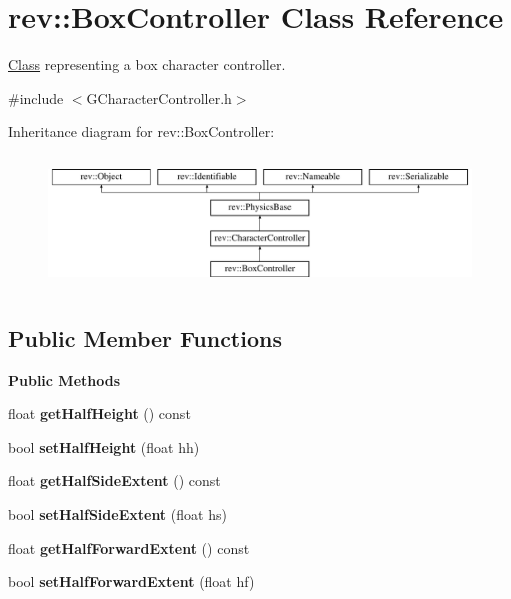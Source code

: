 \hypertarget{classrev_1_1_box_controller}{}\section{rev\+::Box\+Controller Class Reference}
\label{classrev_1_1_box_controller}


\mbox{\hyperlink{struct_class}{Class}} representing a box character controller.  




{\ttfamily \#include $<$G\+Character\+Controller.\+h$>$}

Inheritance diagram for rev\+::Box\+Controller\+:\begin{figure}[H]
\begin{center}
\leavevmode
\includegraphics[height=3.544304cm]{classrev_1_1_box_controller}
\end{center}
\end{figure}
\subsection*{Public Member Functions}
\begin{Indent}\textbf{ Public Methods}\par
\begin{DoxyCompactItemize}
\item 
\mbox{\label{classrev_1_1_box_controller_ad8f91bf9361531b5a17596ccb386e70d}} 
float {\bfseries get\+Half\+Height} () const
\item 
\mbox{\label{classrev_1_1_box_controller_a4c71f014ed5bd8f5de13ff2c974dedd6}} 
bool {\bfseries set\+Half\+Height} (float hh)
\item 
\mbox{\label{classrev_1_1_box_controller_a90ea60786982ff1745e6553887efbf1d}} 
float {\bfseries get\+Half\+Side\+Extent} () const
\item 
\mbox{\label{classrev_1_1_box_controller_ad86f6e2ffab07e9f4b03e96e14851b1a}} 
bool {\bfseries set\+Half\+Side\+Extent} (float hs)
\item 
\mbox{\label{classrev_1_1_box_controller_a72d74ee5c8a523e1b6b48950067c6d4b}} 
float {\bfseries get\+Half\+Forward\+Extent} () const
\item 
\mbox{\label{classrev_1_1_box_controller_acb4fb064de7b1b4ece515d053aa6226c}} 
bool {\bfseries set\+Half\+Forward\+Extent} (float hf)
\end{DoxyCompactItemize}
\end{Indent}

